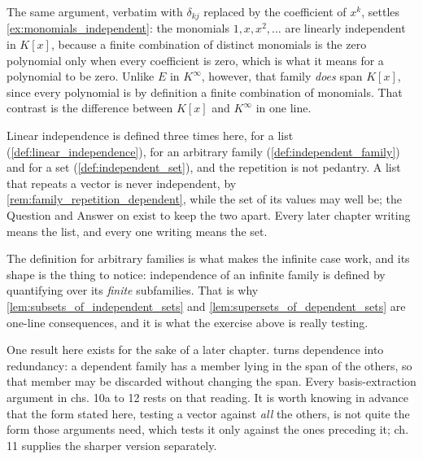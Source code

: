\begin{exercisesolution}
The same argument, verbatim with $\delta_{kj}$ replaced by the coefficient of $x^k$, settles \cref{ex:monomials_independent}: the monomials $1, x, x^2, \dots$ are linearly independent in $K[x]$, because a finite combination of distinct monomials is the zero polynomial only when every coefficient is zero, which is what it means for a polynomial to be zero. Unlike $E$ in $K^\infty$, however, that family \emph{does} span $K[x]$, since every polynomial is by definition a finite combination of monomials. That contrast is the difference between $K[x]$ and $K^\infty$ in one line.
\end{exercisesolution}



\begin{ainote}
Linear independence is defined three times here, for a list
(\cref{def:linear_independence}), for an arbitrary family
(\cref{def:independent_family}) and for a set (\cref{def:independent_set}), and
the repetition is not pedantry. A list that repeats a vector is never
independent, by \cref{rem:family_repetition_dependent}, while the set of its
values may well be; the Question and Answer on  exist
to keep the two apart. Every later chapter writing  means the list, and every one writing  means the set.

The definition for arbitrary families is what makes the infinite case work, and
its shape is the thing to notice: independence of an infinite family is defined
by quantifying over its \emph{finite} subfamilies. That is why
\cref{lem:subsets_of_independent_sets} and
\cref{lem:supersets_of_dependent_sets} are one-line consequences, and it is what
the exercise above is really testing.

One result here exists for the sake of a later chapter.
 turns dependence into redundancy: a
dependent family has a member lying in the span of the others, so that member
may be discarded without changing the span. Every basis-extraction argument in
chs. 10a to 12 rests on that reading. It is worth knowing in advance that the
form stated here, testing a vector against \emph{all} the others, is not quite
the form those arguments need, which tests it only against the ones preceding
it; ch. 11 supplies the sharper version separately.
\end{ainote}

